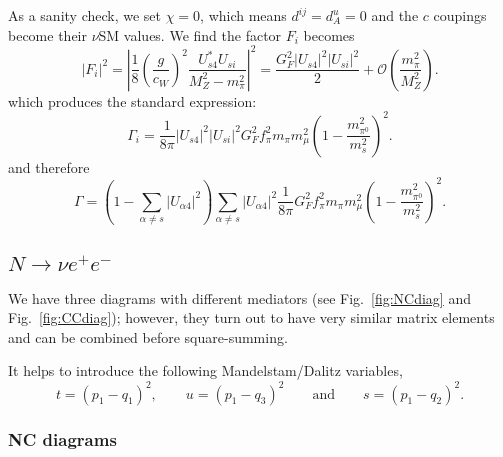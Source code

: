 \documentclass[11pt, a4paper]{article}
\newcommand{\reffig}[1]{Fig.~\ref{#1}}
\begin{document}
As a sanity check, we set $\chi=0$, which means $d^{ij}=d^u_A=0$ and the $c$ coupings become their $\nu$SM values. We find the factor $F_i$ becomes 
%
\[  |F_i|^2 = \left| \frac{1}{8} \left(\frac{g}{c_W}\right)^2 \frac{U^*_{s4}U_{si}}{M_Z^2-m_\pi^2}\right|^2 = \frac{G_F^2|U_{s4}|^2|U_{si}|^2}{2} + \mathcal{O}\left(\frac{m_\pi^2}{M_Z^2}\right). \]
%
which produces the standard expression:
%
\[  \Gamma_i = \frac{1}{8\pi}|U_{s4}|^2|U_{si}|^2 G_F^2 f^2_\pi m_\pi m_\mu^2\left(1-\frac{m^2_{\pi^0}}{m^2_s}\right)^2. \]
%
and therefore
%
\[  \Gamma =  \left(1-\sum_{\alpha \neq s}  |U_{\alpha 4}|^2\right) \sum_{\alpha \neq s} |U_{\alpha 4}|^2 \frac{1}{8\pi} G_F^2 f^2_\pi m_\pi m_\mu^2\left(1-\frac{m^2_{\pi^0}}{m^2_s}\right)^2. \]

\subsection{$N\to \nu e^+e^-$}

We have three diagrams with different mediators (see \reffig{fig:NCdiag} and \reffig{fig:CCdiag}); however, they turn out to have very similar matrix elements and can be combined before square-summing. 

It helps to introduce the following Mandelstam/Dalitz variables, 
%
\[ t=\left(p_1-q_1\right)^2,\qquad u=\left(p_1-q_3\right)^2 \qquad\text{and}\qquad s=\left(p_1-q_2\right)^2. \]

\subsubsection{NC diagrams}
\end{document}
